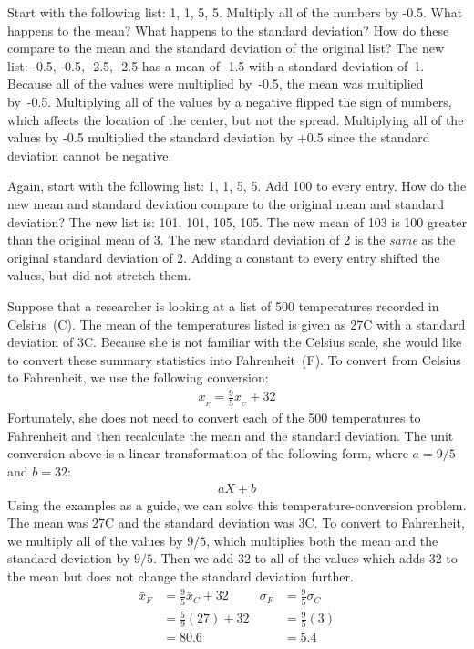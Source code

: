 \begin{example}{Start with the following list:  {1, 1, 5, 5}. Multiply all of the numbers by \mbox{-0.5}. What happens to the mean? What happens to the standard deviation? How do these compare to the mean and the standard deviation of the original list?}
The new list: {-0.5, -0.5, -2.5, -2.5} has a mean of -1.5 with a standard deviation of~1. Because all of the values were multiplied by~\mbox{-0.5}, the mean was multiplied by~\mbox{-0.5}. Multiplying all of the values by a negative flipped the sign of numbers, which affects the location of the center, but not the spread. Multiplying all of the values by \mbox{-0.5} multiplied the standard deviation by +0.5 since the standard deviation cannot be negative.
\end{example}

\begin{example}{Again, start with the following list: {1, 1, 5, 5}. Add 100 to every entry. How do the new mean and standard deviation compare to the original mean and standard deviation?}
The new list is: {101, 101, 105, 105}. The new mean of 103 is 100 greater than the original mean of 3. The new standard deviation of 2 is the \emph{same} as the original standard deviation of 2. Adding a constant to every entry shifted the values, but did not stretch them.
\end{example}

Suppose that a researcher is looking at a list of 500 temperatures recorded in Celsius~(C). The mean of the temperatures listed is given as 27\degree C with a standard deviation of 3\degree C. Because she is not familiar with the Celsius scale, she would like to convert these summary statistics into Fahrenheit~(F). To convert from Celsius to Fahrenheit, we use the following conversion:
\begin{align*}
x_{_F} = \frac{9}{5}x_{_C} + 32
\end{align*}
Fortunately, she does not need to convert each of the 500 temperatures to Fahrenheit and then recalculate the mean and the standard deviation. The unit conversion above is a linear transformation of the following form, where $a=9/5$ and $b=32$:
\begin{align*}
aX + b
\end{align*}
Using the examples as a guide, we can solve this temperature-conversion problem. The mean was 27\degree C and the standard deviation was 3\degree C. To convert to Fahrenheit, we multiply all of the values by $9/5$, which multiplies both the mean and the standard deviation by $9/5$. Then we add 32 to all of the values which adds 32 to the mean but does not change the standard deviation further.
\begin{align*}
\bar{x}_{F} &= \frac{9}{5}\bar{x}_{C} + 32 & \sigma_{F} &= \frac{9}{5}\sigma_{C} \\
&= \frac{5}{9}(27)+ 32 & &=\frac{9}{5}(3) \\
&=80.6 &  &=5.4
\end{align*}

